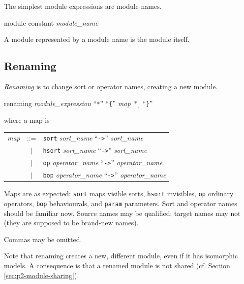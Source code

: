 \documentclass[a4paper]{memoir}
\begin{document}
The simplest module expressions are module names.

\begin{bsyntax} module constant \Hline
\textit{module\_name}
\end{bsyntax}

A module represented by a module name is the module itself.

\subsection{Renaming}

{\em Renaming} is to change sort or operator
names, creating a new module.

\begin{bsyntax} renaming  \Hline
\textit{module\_expression} ``\texttt{*}'' ``\texttt{\{}'' \textit{map} $*_,$ ``\texttt{\}}''
\end{bsyntax}

where a map is

\begin{tabular}{r c l}
  \textit{map} &::=& \verb|sort| \textit{sort\_name} ``\verb|->|'' \textit{sort\_name} \\
      &$|$& \verb|hsort| \textit{sort\_name} ``\verb|->|'' \textit{sort\_name} \\
      &$|$& \verb|op| \textit{operator\_name} ``\verb|->|'' \textit{operator\_name} \\
      &$|$& \verb|bop| \textit{operator\_name} ``\verb|->|'' \textit{operator\_name} \\
\end{tabular}

Maps are as expected: \verb|sort| maps visible sorts, \verb|hsort| invisibles,
\verb|op| ordinary operators, \verb|bop| behaviourals, and \verb|param|
parameters. Sort and operator names should
be familiar now. Source names may be qualified; target names may not
(they are supposed to be brand-new names).

\begin{warning}
  Commas may be omitted.
\end{warning}

Note that renaming creates a new, different module, even if it has
isomorphic models. A consequence is that a renamed module is not
shared (cf. Section \ref{sec:p2-module-sharing}).
\end{document}

